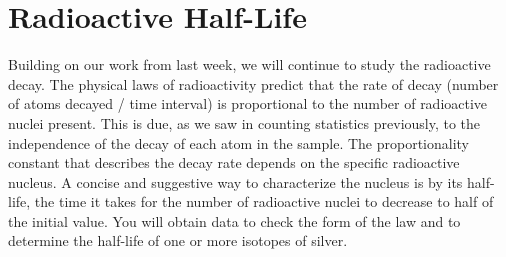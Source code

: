 \chapter{Radioactive Half-Life}


%


Building on our work from last week, we will continue to study the radioactive decay.
The physical laws of radioactivity predict that the rate of decay (number of atoms
decayed / time interval) is proportional to the number of radioactive nuclei present. This
is due, as we saw in counting statistics previously, to the independence of the decay of
each atom in the sample. The proportionality constant that describes the decay rate
depends on the specific radioactive nucleus. A concise and suggestive way to
characterize the nucleus is by its half-life, the time it takes for the number of radioactive
nuclei to decrease to half of the initial value. You will obtain data to check the form of
the law and to determine the half-life of one or more isotopes of silver.

